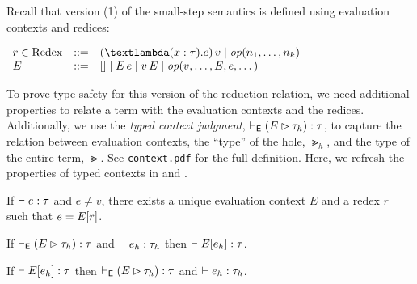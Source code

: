 \documentclass{article}
\begin{document}
Recall that version (1) of the small-step semantics is defined
using evaluation contexts and redices:
\begin{center}
    \begin{minipage}[t]{0.95\textwidth}
        \begin{minipage}{0.65\textwidth}
            $\displaystyle
            \begin{array}{lcl}
                \NT{r}{Redex} \NTEq
                    \TApp{(\TFun{(\TAnn{x}{\Gt})}{e})}{v} \NTSep
                    \TOp{n_1,\dots,n_k}
                    \\
                E \NTEq
                    \THole \NTSep
                    \TApp{E}{e} \NTSep
                    \TApp{v}{E} \NTSep
                    \TOp{v,\dots,E,e,\dots}
            \end{array}$
        \end{minipage}
        \begin{minipage}{0.25\textwidth}
            \begin{prooftree}
            \end{prooftree}
        \end{minipage}
    \end{minipage}
\end{center}

To prove type safety for this version of the reduction relation,
we need additional properties to relate a term with
the evaluation contexts and the redices. Additionally, we use
the \emph{typed context judgment}, $\TContext{E}{\Gt_h}{\Gt}$,
to capture the relation between evaluation contexts, the ``type''
of the hole, $\Gt_h$, and the type of the entire term, $\Gt$.
See \texttt{\footnotesize context.pdf} for the full definition. Here, we
refresh the properties of typed contexts in
 and .

\begin{prop}
    If $\TTypes{}{e}{\Gt}$ and $e\ne v$, there exists a unique evaluation context $E$
    and a redex $r$ such that $e = \inhole{E}{r}$.
\end{prop}

\begin{prop}\label{prop:replug}
  If $\TContext{E}{\Gt_h}{\Gt}$ and $\TTypes{}{e_h}{\Gt_h}$ then $\TTypes{}{\inhole{E}{e_h}}{\Gt}$.
\end{prop}

\begin{prop}\label{prop:decomposition}
  If $\TTypes{}{\inhole{E}{e_h}}{\Gt}$ then $\TContext{E}{\Gt_h}{\Gt}$ and $\TTypes{}{e_h}{\Gt_h}$.
\end{prop}
\end{document}
